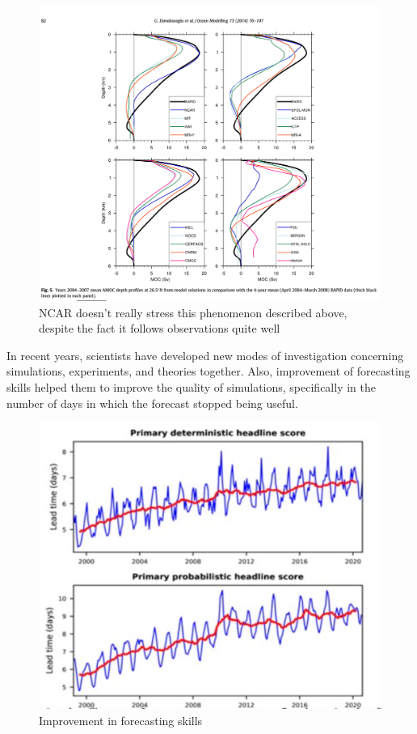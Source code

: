 \begin{figure}[htpb]
	\centering
	\includegraphics[width=0.6\linewidth]{upload/image3.png}
	\caption{NCAR doesn't really stress this phenomenon described above, despite the fact it follows observations quite well}

\end{figure}

In recent years, scientists have developed new modes of investigation concerning simulations, experiments, and theories together. Also, improvement of forecasting skills helped them to improve the quality of simulations, specifically in the number of days in which the forecast stopped being useful.
\begin{figure}[htpb]
	\centering
	\includegraphics[width=0.5\linewidth]{upload/image5.png}
	\caption{Improvement in forecasting skills}

\end{figure}


